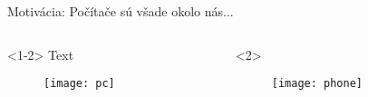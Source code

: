 
\begin{frame}[t]{Motivácia: Počítače sú všade okolo nás...}
\begin{columns}
\begin{column}{.48\textwidth}
\begin{onlyenv}<1-2>
Text \cite{Cholodwicz2017}
\begin{figure}
\centering
  \texttt{[image: pc]}\\
\end{figure}
\end{onlyenv}
\end{column}
\begin{column}{.48\textwidth}
\begin{onlyenv}<2>
\begin{figure}
\centering
  \texttt{[image: phone]}\\
\end{figure}
\end{onlyenv}
\end{column}
\end{columns}
\end{frame}
